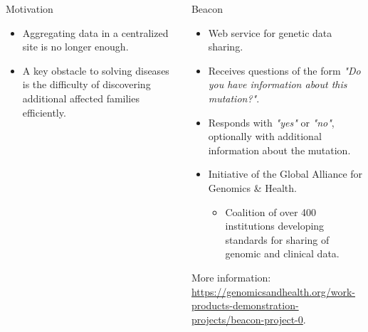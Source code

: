 \documentclass{beamer}
\begin{document}
\begin{frame}[fragile]
\begin{columns}[T]
\begin{column}{.32\textwidth}
\begin{block}{Motivation \hfill{}}
\begin{itemize}
\begin{itemize}
\begin{flushright}
	\end{flushright}
	\vspace{-2mm}
	\end{itemize}
\item Aggregating data in a centralized site is no longer enough.
\item A key obstacle to solving diseases is the difficulty of discovering additional affected families efficiently.
\end{itemize}
\vspace{-1mm}
\end{block}
\end{column}

\begin{column}{.31\textwidth}
\begin{block}{Beacon \hfill{}}
\begin{itemize}
\item Web service for genetic data sharing.
\item Receives questions of the form \textit{"Do you have information about this mutation?"}.
\item Responds with \textit{"yes"} or \textit{"no"}, optionally with additional information about the mutation.
\item Initiative of the Global Alliance for Genomics \& Health.
	\begin{itemize}
	\item Coalition of over 400 institutions developing standards for sharing of genomic and clinical data.
	\end{itemize}
\end{itemize}
More information: \url{https://genomicsandhealth.org/work-products-demonstration-projects/beacon-project-0}.
\end{block}


\end{column}
\end{columns}
\end{frame}
\end{document}
